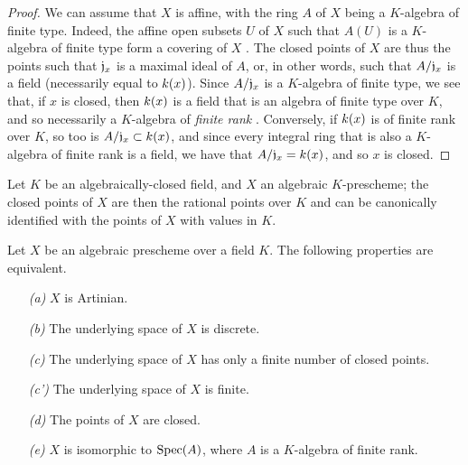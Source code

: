 \begin{proof}
\label{proof-1.6.4.2}
We can assume that $X$ is affine, with the ring $A$ of $X$ being a $K$-algebra of finite type.
Indeed, the affine open subsets $U$ of $X$ such that $A(U)$ is a $K$-algebra of finite type form a covering of $X$ .
The closed points of $X$ are thus the points such that $\mathfrak{j}_x$ is a
maximal ideal of $A$, or, in other words, such that $A/\mathfrak{j}_x$ is a field (necessarily equal to $k(x)$).
Since $A/\mathfrak{j}_x$ is a $K$-algebra of finite type, we see that, if $x$ is closed, then $k(x)$ is a field that is an algebra of finite type over $K$, and so necessarily a $K$-algebra of \emph{finite rank} \cite{I-21}.
Conversely, if $k(x)$ is of finite rank over $K$, so too is $A/\mathfrak{j}_x\subset k(x)$, and since every integral ring that is also a $K$-algebra of finite rank is a field, we have that $A/\mathfrak{j}_x=k(x)$, and so $x$ is closed.
\end{proof}

\begin{cor}[6.4.3]
\label{1.6.4.3}
Let $K$ be an algebraically-closed field, and $X$ an algebraic $K$-prescheme;
the closed points of $X$ are then the rational points over $K$  and can be canonically identified with the points of $X$ with values in $K$.
\end{cor}

\begin{prop}[6.4.4]
\label{1.6.4.4}
Let $X$ be an algebraic prescheme over a field $K$.
The following properties are equivalent.
\begin{enumerate}
    \item[\emph{(a)}] $X$ is Artinian.
    \item[\emph{(b)}] The underlying space of $X$ is discrete.
    \item[\emph{(c)}] The underlying space of $X$ has only a finite number of closed points.
    \item[\emph{(c')}] The underlying space of $X$ is finite.
    \item[\emph{(d)}] The points of $X$ are closed.
    \item[\emph{(e)}] $X$ is isomorphic to ${\mathop{\mathrm{Spec}}\nolimits}(A)$, where $A$ is a $K$-algebra of finite rank.
\end{enumerate}
\end{prop}


